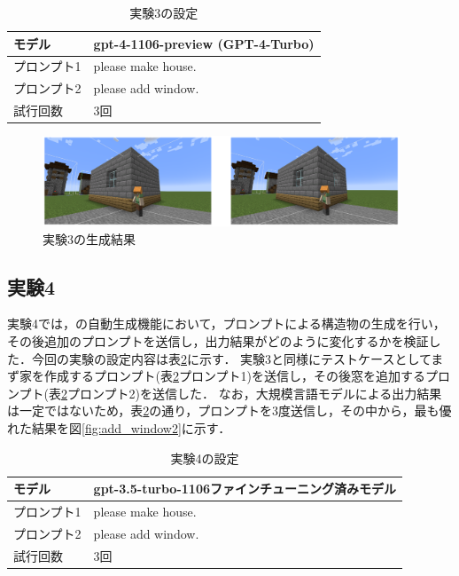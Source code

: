 \begin{table}[H]
    \caption{実験3の設定}\label{tab:setting3}
    \centering
    \begin{tabular}{ll}
        \hline \hline
        モデル & gpt-4-1106-preview (GPT-4-Turbo) \\
        \hline
        プロンプト1 & please make house. \\
        \hline
        プロンプト2 & please add window. \\
        \hline
        試行回数 & 3回 \\
        \hline
    \end{tabular}
\end{table}

\begin{figure}[H]
    \centering
    \includegraphics[width=0.95\textwidth]{fig/add_window.PNG}
    \caption{実験3の生成結果}
    \label{fig:add_window}
\end{figure}

\subsection{実験4}\label{sec:ex4}
実験4では，{\mason}の自動生成機能において，プロンプトによる構造物の生成を行い，その後追加のプロンプトを送信し，出力結果がどのように変化するかを検証した．今回の実験の設定内容は表\ref{tab:setting4}に示す．
実験3と同様にテストケースとしてまず家を作成するプロンプト(表\ref{tab:setting4}プロンプト1)を送信し，その後窓を追加するプロンプト(表\ref{tab:setting4}プロンプト2)を送信した．
なお，大規模言語モデルによる出力結果は一定ではないため，表\ref{tab:setting4}の通り，プロンプトを3度送信し，その中から，最も優れた結果を図\ref{fig:add_window2}に示す．

\begin{table}[H]
    \caption{実験4の設定}\label{tab:setting4}
    \centering
    \begin{tabular}{ll}
        \hline \hline
        モデル & gpt-3.5-turbo-1106ファインチューニング済みモデル \\
        \hline
        プロンプト1 & please make house. \\
        \hline
        プロンプト2 & please add window. \\
        \hline
        試行回数 & 3回 \\
        \hline
    \end{tabular}
\end{table}

